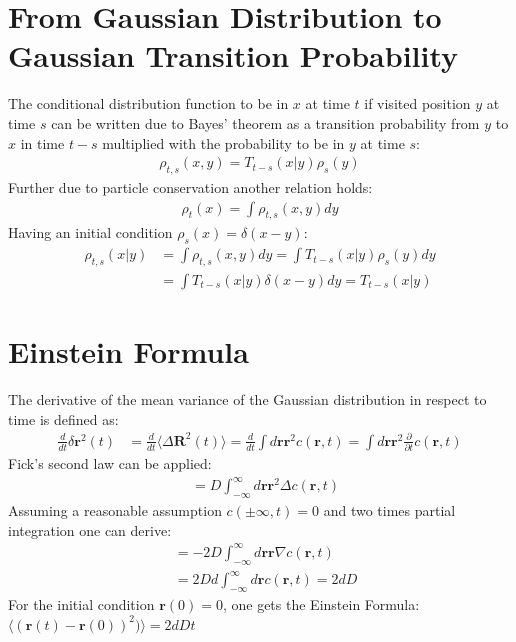 \documentclass[
  a4paper,BCOR10mm,oneside,
  headsepline,footsepline,%
  fleqn,openbib
]{scrbook}
\begin{document}
\section{From Gaussian Distribution to Gaussian Transition Probability}\label{baystheorem}
The conditional distribution function to be in $x$ at time $t$ if visited position $y$ at time $s$   can be written due to Bayes' theorem as a transition probability from $y$ to $x$ in time $t-s$ multiplied with the probability to be in $y$ at time $s$:
\begin{align}
 \rho_{t,s}(x,y)=T_{t-s}(x|y) \rho_s(y)
\end{align}
Further due to particle conservation another relation holds:
\begin{align}
 \rho_{t}(x)= \int \rho_{t,s}(x,y) dy
\end{align}
Having an initial condition $\rho_{s}(x)= \delta(x-y)$:
\begin{align}
 \rho_{t,s}(x|y)&= \int \rho_{t,s}(x,y) dy = \int T_{t-s}(x|y) \rho_s(y) dy\\
 &= \int T_{t-s}(x|y) \delta(x-y) dy 
 = T_{t-s}(x|y)
\end{align}
\section{Einstein Formula} \label{einsteinrealtionappendix}
The derivative of the mean variance of the Gaussian distribution in respect to time is defined as:
\begin{align}
 \frac{d}{dt}  \delta \bm{r}^2(t)&=\frac{d}{dt} \langle \Delta \bm{ R}^2(t)\rangle  =\frac{d}{dt} \int d\bm{r} \bm{r}^2 c(\bm{r},t)=\int d\bm{r} \bm{r}^2 \frac{\partial}{\partial t} c(\bm{r},t) 
\end{align}
Fick's second law can be applied:
\begin{align}
&= D \int_{-\infty}^{\infty}d\bm{r} \bm{r}^2 \Delta c(\bm{r},t)  
\end{align}
Assuming a reasonable assumption  $c(\pm \infty,t)=0$  and two times partial integration one can derive:
\begin{align}
&= -2 D \int_{-\infty}^{\infty} d\bm{r} \bm{r} \nabla c(\bm{r},t) \\ &= 2 D d \int_{-\infty}^{\infty} d\bm{r} c(\bm{r},t) =2dD
\end{align}
For the initial condition $\bm{r}(0) = 0$,  one gets the Einstein Formula: $\langle (\bm{r}(t)-\bm{r}(0))^2)\rangle= 2dDt$

\end{document}
